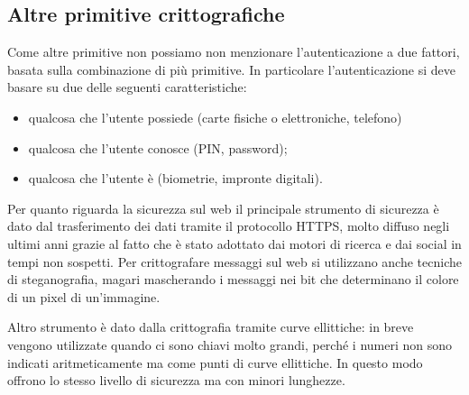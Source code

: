 \subsection{Altre primitive crittografiche}
Come altre primitive non possiamo non menzionare l'autenticazione a due fattori, basata sulla combinazione di più primitive. In particolare l'autenticazione si deve basare su due delle seguenti caratteristiche:
\begin{itemize}
    \item qualcosa che l'utente possiede (carte fisiche o elettroniche, telefono)
    \item qualcosa che l'utente conosce (PIN, password);
    \item qualcosa che l'utente è (biometrie, impronte digitali).
\end{itemize}
Per quanto riguarda la sicurezza sul web il principale strumento di sicurezza è dato dal trasferimento dei dati tramite il protocollo HTTPS, molto diffuso negli ultimi anni grazie al fatto che è stato adottato dai motori di ricerca e dai social in tempi non sospetti. Per crittografare messaggi sul web si utilizzano anche tecniche di steganografia, magari mascherando i messaggi nei bit che determinano il colore di un pixel di un'immagine.

\vspace{5mm}

Altro strumento è dato dalla crittografia tramite curve ellittiche: in breve vengono utilizzate quando ci sono chiavi molto grandi, perché i numeri non sono indicati aritmeticamente ma come punti di curve ellittiche. In questo modo offrono lo stesso livello di sicurezza ma con minori lunghezze.




